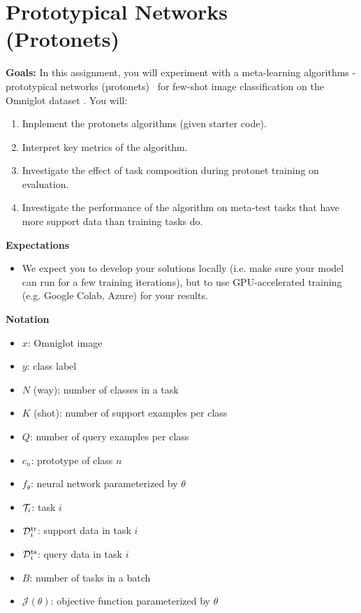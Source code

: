 \section{Prototypical Networks (Protonets)~\cite{prototypical}}

\textbf{Goals:} In this assignment, you will experiment with a meta-learning algorithms - prototypical networks (protonets)~\cite{prototypical} for few-shot image classification on the Omniglot dataset \cite{Lake1332}. You will:
\begin{enumerate}
    \item Implement the protonets algorithms (given starter code).
    \item Interpret key metrics of the algorithm.
    \item Investigate the effect of task composition during protonet training on evaluation.
    \item Investigate the performance of the algorithm on meta-test tasks that have more support data than training tasks do.
\end{enumerate}

\textbf{Expectations}
\begin{itemize}
    \item We expect you to develop your solutions locally (i.e. make sure your model can run for a few training iterations), but to use GPU-accelerated training (e.g. Google Colab, Azure) for your results.
\end{itemize}

\textbf{Notation}
\begin{itemize}
    \item $x$: Omniglot image
    \item $y$: class label
    \item $N$ (way): number of classes in a task
    \item $K$ (shot): number of support examples per class
    \item $Q$: number of query examples per class
    \item $c_n$: prototype of class $n$
    \item $f_\theta$: neural network parameterized by $\theta$
    \item $\mathcal{T}_i$: task $i$
    \item $\mathcal{D}^\mathrm{tr}_i$: support data in task $i$
    \item $\mathcal{D}^\mathrm{ts}_i$: query data in task $i$
    \item $B$: number of tasks in a batch
    \item $\mathcal{J}(\theta)$: objective function parameterized by $\theta$
\end{itemize}

